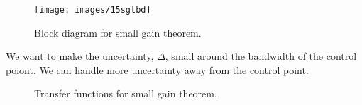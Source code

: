 \begin{figure}[ht!]
\centering
\texttt{[image: images/15sgtbd]}
\caption{Block diagram for small gain theorem.}
\label{fig:15sgtbd}
\end{figure}

We want to make the uncertainty, $\Delta$, small around the bandwidth of the control poiont. We can handle more uncertainty away from the control point.

\begin{figure}[ht!]
\centering
{} \hfill
{}
\caption{Transfer functions for small gain theorem.}
\label{fig:15sgt}
\end{figure}
